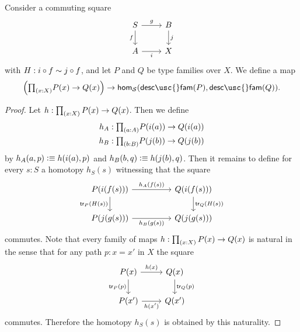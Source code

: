 \begin{defn}\label{defn:hom-Fam-pushout-map}
  Consider a commuting square
  \begin{equation*}
    \begin{tikzcd}
      S \arrow[r,"g"] \arrow[d,swap,"f"] & B \arrow[d,"j"] \\
      A \arrow[r,swap,"i"] & X
    \end{tikzcd}
  \end{equation*}
  with $H:i\circ f \sim j \circ f$, and let $P$ and $Q$ be type families over $X$. We define a map
  \begin{equation*}
    \Big(\prd{x:X}P(x)\to Q(x)\Big) \to \mathsf{hom}_{\mathcal{S}}(\mathsf{desc\usc{}fam}(P),\mathsf{desc\usc{}fam}(Q)).
  \end{equation*}
\end{defn}

\begin{proof}
  Let $h:\prd{x:X}P(x)\to Q(x)$. Then we define
  \begin{align*}
    h_A & : \prd{a:A}P(i(a))\to Q(i(a)) \\
    h_B & : \prd{b:B}P(j(b))\to Q(j(b))
  \end{align*}
  by $h_A(a,p)\vcentcolon\equiv h(i(a),p)$ and $h_B(b,q)\vcentcolon\equiv h(j(b),q)$. Then it remains to define for every $s:S$ a homotopy $h_S(s)$ witnessing that the square
  \begin{equation*}
    \begin{tikzcd}[column sep=huge]
      P(i(f(s))) \arrow[r,"h_A(f(s))"] \arrow[d,swap,"\mathsf{tr}_P(H(s))"] & Q(i(f(s))) \arrow[d,"\mathsf{tr}_Q(H(s))"] \\
      P(j(g(s))) \arrow[r,swap,"h_B(g(s))"] & Q(j(g(s)))
    \end{tikzcd}
  \end{equation*}
  commutes. Note that every family of maps $h:\prd{x:X}P(x)\to Q(x)$ is natural in the sense that for any path $p:x=x'$ in $X$ the square
  \begin{equation*}
    \begin{tikzcd}
      P(x) \arrow[r,"h(x)"] \arrow[d,swap,"\mathsf{tr}_P(p)"] & Q(x) \arrow[d,"\mathsf{tr}_Q(p)"] \\
      P(x') \arrow[r,swap,"{h(x')}"] & Q(x')
    \end{tikzcd}
  \end{equation*}
  commutes. Therefore the homotopy $h_S(s)$ is obtained by this naturality.
\end{proof}

